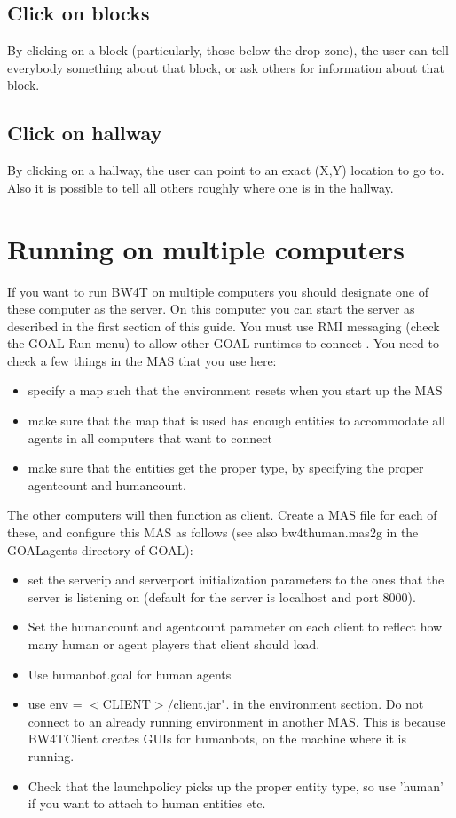 \documentclass[11pt,a4paper]{article}
\begin{document}
\subsection{Click on blocks}
By clicking on a block (particularly, those below the drop zone), the user can tell everybody something about that block, or ask others for information about that block.
\subsection{Click on hallway}
By clicking on a hallway, the user can point to an exact (X,Y) location to go to. Also it is possible to tell all others roughly where one is in the hallway.

\section{Running on multiple computers}
If you want to run BW4T on multiple computers you should designate one of these computer as the server. On this computer you can start the server as described in the first section of this guide. You must use RMI messaging (check the GOAL Run menu) to allow other GOAL runtimes to connect .
You need to check a few things in the MAS that you use here:
\begin{itemize}
\item specify a map such that the environment resets when you start up the MAS
\item make sure that the map that is used has enough entities to accommodate all agents in all computers that want to connect
\item make sure that the entities get the proper type, by specifying the proper agentcount and humancount.
\end{itemize}
The other computers will then function as client. Create a MAS file for each of these, and configure this MAS as follows (see also bw4thuman.mas2g in the GOALagents directory of GOAL):
\begin{itemize}
\item set the serverip and serverport initialization parameters to the ones that the server is listening on (default for the server is localhost and port 8000).
\item Set the humancount and agentcount parameter on each client to reflect how many human or agent players that client should load.
\item Use humanbot.goal for human agents
\item use env = $<$CLIENT$>/$client.jar". in the environment section. Do not connect to an already running environment in another MAS. This is because BW4TClient creates GUIs for humanbots, on the machine where it is running.
\item Check that the launchpolicy picks up the proper entity type, so use 'human' if you want to attach to human entities etc.
\end{itemize} 
\end{document}
